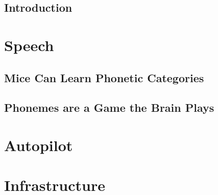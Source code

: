 
\maketitle
\clearpage



\tableofcontents%
%
\mainmatter

\chapter*{Introduction}



\part{Speech}

\chapter{Mice Can Learn Phonetic Categories}





\chapter{Phonemes are a Game the Brain Plays}



\part{Autopilot}





\part{Infrastructure}





